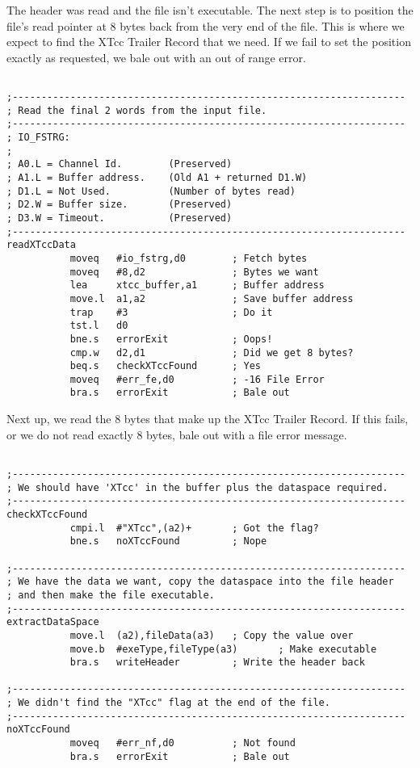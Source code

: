 The header was read and the file isn't executable. The next step is to position the file's read pointer at 8 bytes back from the very end of the file. This is where we expect to find the XTcc Trailer Record that we need. If we fail to set the position exactly as requested, we bale out with an out of range error.


\begin{lstlisting}[firstnumber=last,caption={XTcc - Read the XTcc Trailer Record}]

;--------------------------------------------------------------------
; Read the final 2 words from the input file.
;--------------------------------------------------------------------
; IO_FSTRG:
;
; A0.L = Channel Id.        (Preserved)
; A1.L = Buffer address.    (Old A1 + returned D1.W)
; D1.L = Not Used.          (Number of bytes read)
; D2.W = Buffer size.       (Preserved)
; D3.W = Timeout.           (Preserved)
;--------------------------------------------------------------------
readXTccData
           moveq   #io_fstrg,d0        ; Fetch bytes
           moveq   #8,d2               ; Bytes we want
           lea     xtcc_buffer,a1      ; Buffer address
           move.l  a1,a2               ; Save buffer address
           trap    #3                  ; Do it
           tst.l   d0
           bne.s   errorExit           ; Oops!
           cmp.w   d2,d1               ; Did we get 8 bytes?
           beq.s   checkXTccFound      ; Yes
           moveq   #err_fe,d0          ; -16 File Error
           bra.s   errorExit           ; Bale out
\end{lstlisting}

Next up, we read the 8 bytes that make up the XTcc Trailer Record. If this fails, or we do not read exactly 8 bytes, bale out with a file error message.


\begin{lstlisting}[firstnumber=last,caption={XTcc - Setting the Header Data}]

;--------------------------------------------------------------------
; We should have 'XTcc' in the buffer plus the dataspace required.
;--------------------------------------------------------------------
checkXTccFound
           cmpi.l  #"XTcc",(a2)+       ; Got the flag?
           bne.s   noXTccFound         ; Nope

;--------------------------------------------------------------------
; We have the data we want, copy the dataspace into the file header
; and then make the file executable.
;--------------------------------------------------------------------
extractDataSpace
           move.l  (a2),fileData(a3)   ; Copy the value over
           move.b  #exeType,fileType(a3)       ; Make executable
           bra.s   writeHeader         ; Write the header back

;--------------------------------------------------------------------
; We didn't find the "XTcc" flag at the end of the file.
;--------------------------------------------------------------------
noXTccFound
           moveq   #err_nf,d0          ; Not found
           bra.s   errorExit           ; Bale out
\end{lstlisting}

